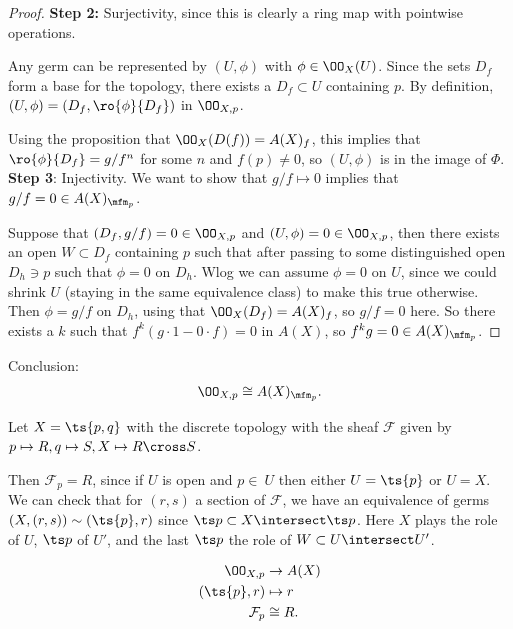 \begin{proof}
\textbf{Step 2:} Surjectivity, since this is clearly a ring map with
pointwise operations.

Any germ can be represented by \((U, \phi)\) with \(\phi \in \OO_X(U)\).
Since the sets \(D_f\) form a base for the topology, there exists a
\(D_f\subset U\) containing \(p\). By definition,
\((U, \phi) = (D_f, \ro{\phi}{D_f})\) in \(\OO_{X, p}\).

Using the proposition that \(\OO_X(D(f)) = A(X)_f\), this implies that
\(\ro{\phi}{D_f} = g/f^n\) for some \(n\) and \(f(p) \neq 0\), so
\((U, \phi)\) is in the image of \(\Phi\).\\

\textbf{Step 3}: Injectivity. We want to show that \(g/f\mapsto 0\)
implies that \(g/f = 0 \in A(X)_{\mfm_p}\).

Suppose that \((D_f, g/f) = 0 \in \OO_{X, p}\) and
\((U, \phi) = 0 \in \OO_{X,p}\), then there exists an open
\(W\subset D_f\) containing \(p\) such that after passing to some
distinguished open \(D_h\ni p\) such that \(\phi = 0\) on \(D_h\). Wlog
we can assume \(\phi = 0\) on \(U\), since we could shrink \(U\)
(staying in the same equivalence class) to make this true otherwise.
Then \(\phi = g/f\) on \(D_h\), using that \(\OO_X(D_f) = A(X)_f\), so
\(g/f = 0\) here. So there exists a \(k\) such that
\(f^k(g\cdot 1 - 0\cdot f) = 0\) in \(A(X)\), so
\(f^k g=0 \in A(X)_{\mfm_p}\).

\end{proof}

Conclusion:
\begin{align*}  
\OO_{X, p} \cong A(X)_{\mfm_p}
.\end{align*}

\begin{example}

Let \(X = \ts{p, q}\) with the discrete topology with the sheaf
\(\mathcal{F}\) given by \(p\mapsto R, q\mapsto S, X\mapsto R\cross S\).

Then \(\mathcal{F}_p = R\), since if \(U\) is open and \(p\in\ U\) then
either \(U= \ts{p}\) or \(U = X\). We can check that for \((r, s)\) a
section of \(\mathcal{F}\), we have an equivalence of germs
\((X, (r, s)) \sim (\ts{p}, r)\) since
\(\ts p \subset X\intersect \ts p\). Here \(X\) plays the role of \(U\),
\(\ts p\) of \(U'\), and the last \(\ts p\) the role of
\(W \subset U\intersect U'\).

\begin{align*}  
\OO_{X, p} &\to A(X) \\
(\ts{p}, r) &\mapsto r \\
\mathcal{F}_p &\cong R
.\end{align*}

\end{example}

